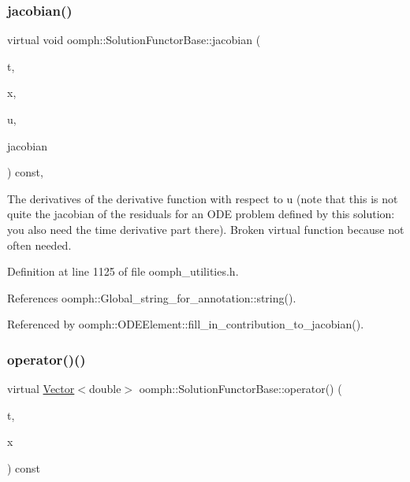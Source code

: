 \subsubsection{\texorpdfstring{jacobian()}{jacobian()}}
{\footnotesize\ttfamily virtual void oomph\+::\+Solution\+Functor\+Base\+::jacobian (\begin{DoxyParamCaption}\item[{const double \&}]{t,  }\item[{const \hyperlink{classoomph_1_1Vector}{Vector}$<$ double $>$ \&}]{x,  }\item[{const \hyperlink{classoomph_1_1Vector}{Vector}$<$ double $>$ \&}]{u,  }\item[{\hyperlink{classoomph_1_1DenseMatrix}{Dense\+Matrix}$<$ double $>$ \&}]{jacobian }\end{DoxyParamCaption}) const\hspace{0.3cm}{\ttfamily [inline]}, {\ttfamily [virtual]}}

The derivatives of the derivative function with respect to u (note that this is not quite the jacobian of the residuals for an O\+DE problem defined by this solution\+: you also need the time derivative part there). Broken virtual function because not often needed. 

Definition at line 1125 of file oomph\+\_\+utilities.\+h.



References oomph\+::\+Global\+\_\+string\+\_\+for\+\_\+annotation\+::string().



Referenced by oomph\+::\+O\+D\+E\+Element\+::fill\+\_\+in\+\_\+contribution\+\_\+to\+\_\+jacobian().

\mbox{\label{classoomph_1_1SolutionFunctorBase_ad7177a415b2ef72f89b69dc68028166d}} 
\subsubsection{\texorpdfstring{operator()()}{operator()()}}
{\footnotesize\ttfamily virtual \hyperlink{classoomph_1_1Vector}{Vector}$<$double$>$ oomph\+::\+Solution\+Functor\+Base\+::operator() (\begin{DoxyParamCaption}\item[{const double \&}]{t,  }\item[{const \hyperlink{classoomph_1_1Vector}{Vector}$<$ double $>$ \&}]{x }\end{DoxyParamCaption}) const\hspace{0.3cm}{\ttfamily [pure virtual]}}




